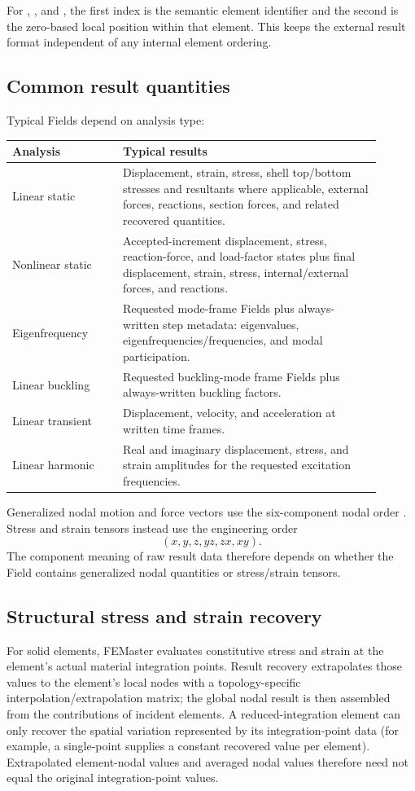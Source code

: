 For , , and , the first index is the semantic element identifier and the second is the zero-based local position within that element. This keeps the external result format independent of any internal element ordering.

\subsection*{Common result quantities}

Typical Fields depend on analysis type:
\begin{longtable}{@{}p{0.27\linewidth}p{0.63\linewidth}@{}}
\toprule
\textbf{Analysis} & \textbf{Typical results} \\
\midrule
\endhead
Linear static & Displacement, strain, stress, shell top/bottom stresses and resultants where applicable, external forces, reactions, section forces, and related recovered quantities. \\
Nonlinear static & Accepted-increment displacement, stress, reaction-force, and load-factor states plus final displacement, strain, stress, internal/external forces, and reactions. \\
Eigenfrequency & Requested mode-frame Fields plus always-written step metadata: eigenvalues, eigenfrequencies/frequencies, and modal participation. \\
Linear buckling & Requested buckling-mode frame Fields plus always-written buckling factors. \\
Linear transient & Displacement, velocity, and acceleration at written time frames. \\
Linear harmonic & Real and imaginary displacement, stress, and strain amplitudes for the requested excitation frequencies. \\
\bottomrule
\end{longtable}

Generalized nodal motion and force vectors use the six-component nodal order \dofvec. Stress and strain tensors instead use the engineering order
\[
(x,y,z,yz,zx,xy).
\]
The component meaning of raw result data therefore depends on whether the Field contains generalized nodal quantities or stress/strain tensors.

\subsection*{Structural stress and strain recovery}

For solid elements, FEMaster evaluates constitutive stress and strain at the element's actual material integration points. Result recovery extrapolates those values to the element's local nodes with a topology-specific interpolation/extrapolation matrix; the global nodal result is then assembled from the contributions of incident elements. A reduced-integration element can only recover the spatial variation represented by its integration-point data (for example, a single-point  supplies a constant recovered value per element). Extrapolated element-nodal values and averaged nodal values therefore need not equal the original integration-point values.

